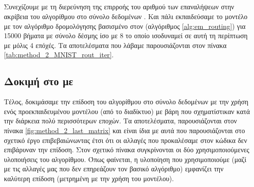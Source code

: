 \subsection{}

Συνεχίζουμε με τη διερεύνηση της επιρροής του αριθμού των επαναλήψεων στην ακρίβεια του αλγορίθμου στο σύνολο δεδομένων . Και πάλι εκπαιδεύσαμε το μοντέλο με τον αλγόριθμο δρομολόγησης βασισμένο στον  (αλγόριθμος \ref{alg:em_routing}) για 15000 βήματα με σύνολο δέσμης ίσο με 8 το οποίο ισοδυναμεί σε αυτή τη περίπτωση με μόλις 4 επόχές. Τα αποτελέσματα που λάβαμε παρουσιάζονται στον πίνακα \ref{tab:method_2_MNIST_rout_iter}.
\begin{table}[h]
    \begin{center}
    \end{center}
    \caption[]{\label{tab:method_2_MNIST_rout_iter}Πίνακας στον οποίο φαίνεται η επίδραση του αριθμού των επαναλήψεων στην επίδοση του μοντέλου εκπαιδευμένου στο σύνολο  για πολύ λίγες εποχές.} 
\end{table}

\subsection{Δοκιμή στο  με }
Τέλος, δοκιμάσαμε την επίδοση του αλγορίθμου στο σύνολο δεδομένων  με την χρήση ενός προ\textendash εκπαιδευμένου μοντέλου (από το διαδίκτυο) με βάρη που σχηματίστικαν κατά την διάρκεια πολύ περισσότερων εποχών. Τα αποτελέσματα, παρουσιάζονται στον πίνακα \ref{fig:method_2_last_matrix} και είναι ίδια με αυτά που παρουσιάζονται στο σχετικό έργο \cite{hinton2018matrix} επιβεβαιώνωντας έτσι ότι οι αλλαγές που προκαλέσαμε στον κώδικα δεν επιβάρυναν την επίδοση. Στον σχετικό πίνακα συγκρίνονται οι δύο χρησιμοποιούμενες υλοποιήσεις του αλγορίθμου. Όπως φαίνεται, η υλοποίηση που χρησιμοποιούμε (μαζί με τις αλλαγές μας που δεν επηρεάζουν τον βασικό αλγόριθμο) εμφανίζει την καλύτερη επίδοση (μετρημένη με την χρήση του  μοντέλου).\par


